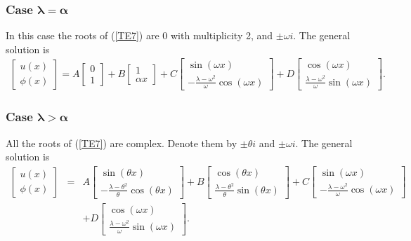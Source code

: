 \documentclass[../../main.tex]{subfiles}
\begin{document}
\subsubsection{Case $\boldsymbol{ \lambda=\alpha}$}

In this case the roots of (\ref{TE7}) are $0$ with multiplicity 2, and $\pm \omega i$. The general solution is
\begin{eqnarray*}
	\begin{bmatrix}
		u(x)\\ \phi(x)
	\end{bmatrix}
	=
	A
	\begin{bmatrix}
		0 \\1
	\end{bmatrix}
	+
	B
	\begin{bmatrix}
		1 \\ \alpha x
	\end{bmatrix}
	+
	C
	\begin{bmatrix}
		\sin (\omega x) \\ -\frac{\lambda-\omega^{2}}{\omega}\cos (\omega x)
	\end{bmatrix}
	+
	D
	\begin{bmatrix}
		\cos (\omega x) \\ \frac{\lambda-\omega^{2}}{\omega}\sin (\omega x)
	\end{bmatrix}.\label{T9}
\end{eqnarray*}

\subsubsection{Case $\boldsymbol{\lambda>\alpha}$}

All the roots of (\ref{TE7}) are complex. Denote them by $\pm \theta i$ and $\pm \omega i$. The general solution is
\begin{eqnarray*}
\begin{bmatrix}
u(x)\\ \phi(x)
\end{bmatrix}
&=&
A
\begin{bmatrix}
\sin (\theta  x) \\-\frac{\lambda-\theta^{2}}{\theta}\cos (\theta x)
\end{bmatrix}
+
B
\begin{bmatrix}
\cos (\theta x) \\ \frac{\lambda-\theta^{2}}{\theta}\sin (\theta x)
\end{bmatrix}
+
C
\begin{bmatrix}
\sin (\omega x) \\ -\frac{\lambda-\omega^{2}}{\omega}\cos (\omega x)
\end{bmatrix}\\
&&
+
D
\begin{bmatrix}
\cos (\omega x) \\ \frac{\lambda-\omega^{2}}{\omega}\sin (\omega x)
\end{bmatrix}.\label{T10}
\end{eqnarray*}
\end{document}
